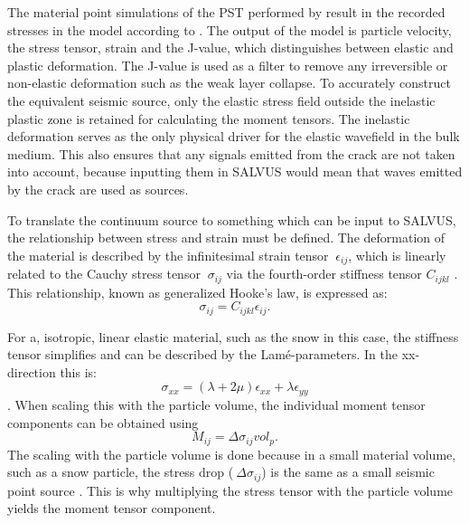 The material point simulations of the PST performed by \parencite{gaumeDynamicAnticrackPropagation2018,trottetTransitionSubRayleighAnticrack2022} result in the recorded stresses in the model according to \cite{gaumeInvestigatingReleaseFlow2019}. The output of the model is particle velocity, the stress tensor, strain and the J-value, which distinguishes between elastic and plastic deformation. The J-value is used as a filter to remove any irreversible or non-elastic deformation such as the weak layer collapse. To accurately construct the equivalent seismic source, only the elastic stress field outside the inelastic plastic zone is retained for calculating the moment tensors. The inelastic deformation serves as the only physical driver for the elastic wavefield in the bulk medium. This also ensures that any signals emitted from the crack are not taken into account, because inputting them in SALVUS would mean that waves emitted by the crack are used as sources. \par

To translate the continuum source to something which can be input to SALVUS, the relationship between stress and strain must be defined. The deformation of the material is described by the infinitesimal strain tensor $\ \epsilon_{ij}$, which is linearly related to the Cauchy stress tensor $\ \sigma_{ij}$ via the fourth-order stiffness tensor $C_ {ijkl}$ \parencite{holzapfelNonlinearSolidMechanics2010}. This relationship, known as generalized Hooke's law, is expressed as:
\begin{equation}
  \sigma_{ij} = C_{ijkl} \epsilon_{ij}. 
\end{equation}

For a, isotropic, linear elastic material, such as the snow in this case, the stiffness tensor simplifies and can be described by the Lamé-parameters. In the xx-direction this is: \begin{equation}
  \sigma_{xx} = (\lambda + 2\mu)\epsilon_{xx} + \lambda \epsilon_{yy}
\end{equation} \parencite{kAkiRichards19801981}. When scaling this with the particle volume, the individual moment tensor components can be obtained using \begin{equation}
  M_{ij} = \Delta\sigma_{ij} vol_p.
\end{equation} The scaling with the particle volume is done because in a small material volume, such as a snow particle, the stress drop ($\ \Delta \sigma_{ij}$) is the same as a small seismic point source \parencite{backusMomentTensorsOther1976}. This is why multiplying the stress tensor with the particle volume yields the moment tensor component.  \par

